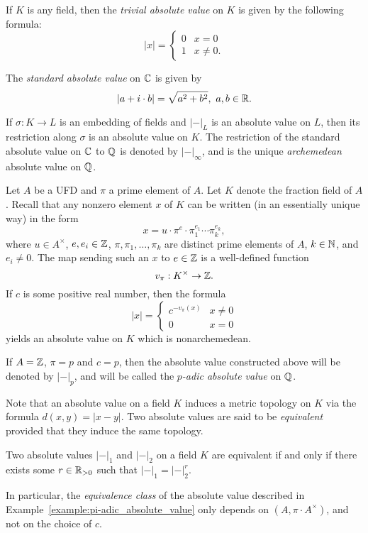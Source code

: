 \begin{example}
  If $K$ is any field, then the \emph{trivial absolute value} on $K$ is given by the following formula:
  \[ |x| = \begin{cases}
             0 & x = 0 \\
             1 & x \neq 0.
           \end{cases} \]
\end{example}

\begin{example}
  The \emph{standard absolute value} on $\mathbb{C}$ is given by
  \[ |a + i \cdot b| = \sqrt{a^{2} + b^{2}}, \ a,b \in \mathbb{R}. \]
\end{example}

\begin{example}
  If $\sigma : K \to L$ is an embedding of fields and $|-|_{L}$ is an absolute value on $L$, then its restriction along $\sigma$ is an absolute value on $K$.
  The restriction of the standard absolute value on $\mathbb{C}$ to $\mathbb{Q}$ is denoted by $|-|_{\infty}$, and is the unique \emph{archemedean} absolute value on $\mathbb{Q}$.
\end{example}

\begin{example}\label{example:pi-adic_absolute_value}
  Let $A$ be a UFD and $\pi$ a prime element of $A$.
  Let $K$ denote the fraction field of $A$.
  Recall that any nonzero element $x$ of $K$ can be written (in an essentially unique way) in the form
  \[ x = u \cdot \pi^{e} \cdot \pi_{1}^{e_{1}} \cdots \pi_{k}^{e_{k}}, \]
  where $u \in A^{\times}$, $e, e_{i} \in \mathbb{Z}$, $\pi,\pi_{1},\ldots,\pi_{k}$ are distinct prime elements of $A$, $k \in \mathbb{N}$, and $e_{i} \neq 0$.
  The map sending such an $x$ to $e \in \mathbb{Z}$ is a well-defined function
  \[ v_{\pi} : K^{\times} \to \mathbb{Z}. \]
  If $c$ is some positive real number, then the formula
  \[ |x| = \begin{cases}
             c^{-v_{\pi}(x)} & x \neq 0 \\
             0 & x = 0
           \end{cases} \]
  yields an absolute value on $K$ which is nonarchemedean.

  If $A = \mathbb{Z}$, $\pi = p$ and $c = p$, then the absolute value constructed above will be denoted by $|-|_{p}$, and will be called the \emph{$p$-adic absolute value} on $\mathbb{Q}$.
\end{example}

Note that an absolute value on a field $K$ induces a metric topology on $K$ via the formula $d(x,y) = |x-y|$.
Two absolute values are said to be \emph{equivalent} provided that they induce the same topology.
\begin{proposition}
  Two absolute values $|-|_{1}$ and $|-|_{2}$ on a field $K$ are equivalent if and only if there exists some $r \in \mathbb{R}_{> 0}$ such that $|-|_{1} = |-|_{2}^{r}$.
\end{proposition}
In particular, the \emph{equivalence class} of the absolute value described in Example~\ref{example:pi-adic_absolute_value} only depends on $(A,\pi \cdot A^{\times})$, and not on the choice of $c$.

